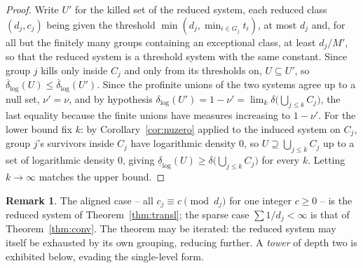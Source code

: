 \documentclass[11pt]{article}
\theoremstyle{plain}
\theoremstyle{definition}
\newtheorem{remark}[theorem]{Remark}
\newcommand{\dlog}{\delta_{\log}}
\begin{document}
\begin{proof}
Write $U'$ for the killed set of the reduced system, each
reduced class $(d_j,c_j)$ being given the threshold
$\min(d_j,\min_{i\in G_j}t_i)$, at most $d_j$ and, for all but
the finitely many groups containing an exceptional class, at
least $d_j/M'$, so that the reduced system is a threshold system
with the same constant.  Since group $j$ kills only inside $C_j$ and only
from its thresholds on, $U\subseteq U'$, so
$\overline{\delta}_{\log}(U)\le\overline{\delta}_{\log}(U')$.
Since the profinite unions of the two systems agree up to a
null set, $\nu'=\nu$, and by hypothesis
$\dlog(U')=1-\nu'=\lim_k\delta\bigl(\bigcup_{j\le k}C_j\bigr)$,
the last equality because the finite unions have measures
increasing to $1-\nu'$.  For
the lower bound fix $k$: by Corollary~\ref{cor:nuzero} applied
to the induced system on $C_j$, group $j$'s survivors inside
$C_j$ have logarithmic density $0$, so
$U\supseteq\bigcup_{j\le k}C_j$ up to a set of logarithmic
density $0$, giving
$\underline{\delta}_{\log}(U)\ge\delta\bigl(\bigcup_{j\le k}C_j\bigr)$
for every $k$.  Letting $k\to\infty$ matches the upper bound.
\end{proof}

\begin{remark}
The aligned case -- all $c_j\equiv c\pmod{d_j}$ for one integer
$c\ge0$ -- is the reduced system of Theorem~\ref{thm:transl};
the sparse case $\sum1/d_j<\infty$ is that of
Theorem~\ref{thm:conv}.  The theorem may be iterated: the
reduced system may itself be exhausted by its own grouping,
reducing further.  A \emph{tower} of depth two is exhibited
below, evading the single-level form.
\end{remark}
\end{document}
